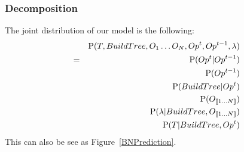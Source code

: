 \subsubsection{Decomposition}
The joint distribution of our model is the following:
\begin{eqnarray}
    & & \mathrm{P}(T, BuildTree, O_1 \dots O_N, Op^t, Op^{t-1}, \lambda) \\ 
& = &   \mathrm{P}(Op^t | Op^{t-1}) \\
    & & \mathrm{P}(Op^{t-1}) \\
    & & \mathrm{P}(BuildTree | Op^t) \\
    & & \mathrm{P}(O_{\llbracket 1 \dots N\rrbracket}) \\
    & & \mathrm{P}(\lambda | BuildTree, O_{\llbracket 1 \dots N\rrbracket}) \\
    & & \mathrm{P}(T | BuildTree, Op^t) 
\end{eqnarray}
This can also be see as Figure~\ref{BNPrediction}.

